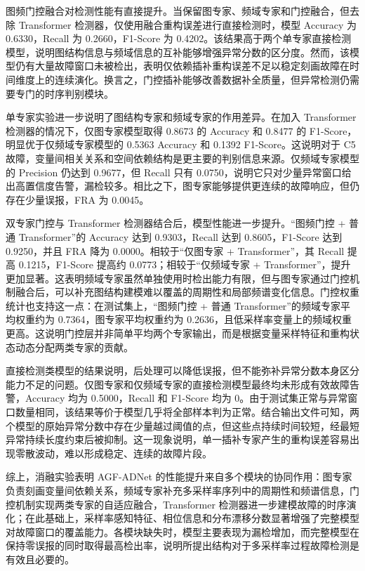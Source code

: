 图频门控融合对检测性能有直接提升。当保留图专家、频域专家和门控融合，但去除 Transformer 检测器，仅使用融合重构误差进行直接检测时，模型 Accuracy 为 0.6330，Recall 为 0.2660，F1-Score 为 0.4202。该结果高于两个单专家直接检测模型，说明图结构信息与频域信息的互补能够增强异常分数的区分度。然而，该模型仍有大量故障窗口未被检出，表明仅依赖插补重构误差不足以稳定刻画故障在时间维度上的连续演化。换言之，门控插补能够改善数据补全质量，但异常检测仍需要专门的时序判别模块。

单专家实验进一步说明了图结构专家和频域专家的作用差异。在加入 Transformer 检测器的情况下，仅图专家模型取得 0.8673 的 Accuracy 和 0.8477 的 F1-Score，明显优于仅频域专家模型的 0.5363 Accuracy 和 0.1392 F1-Score。这说明对于 C5 故障，变量间相关关系和空间依赖结构是更主要的判别信息来源。仅频域专家模型的 Precision 仍达到 0.9677，但 Recall 只有 0.0750，说明它只对少量异常窗口给出高置信度告警，漏检较多。相比之下，图专家能够提供更连续的故障响应，但仍存在少量误报，FRA 为 0.0045。

双专家门控与 Transformer 检测器结合后，模型性能进一步提升。“图频门控 + 普通 Transformer”的 Accuracy 达到 0.9303，Recall 达到 0.8605，F1-Score 达到 0.9250，并且 FRA 降为 0.0000。相较于“仅图专家 + Transformer”，其 Recall 提高 0.1215，F1-Score 提高约 0.0773；相较于“仅频域专家 + Transformer”，提升更加显著。这表明频域专家虽然单独使用时检出能力有限，但与图专家通过门控机制融合后，可以补充图结构建模难以覆盖的周期性和局部频谱变化信息。门控权重统计也支持这一点：在测试集上，“图频门控 + 普通 Transformer”的频域专家平均权重约为 0.7364，图专家平均权重约为 0.2636，且低采样率变量上的频域权重更高。这说明门控层并非简单平均两个专家输出，而是根据变量采样特征和重构状态动态分配两类专家的贡献。

直接检测类模型的结果说明，后处理可以降低误报，但不能弥补异常分数本身区分能力不足的问题。仅图专家和仅频域专家的直接检测模型最终均未形成有效故障告警，Accuracy 均为 0.5000，Recall 和 F1-Score 均为 0。由于测试集正常与异常窗口数量相同，该结果等价于模型几乎将全部样本判为正常。结合输出文件可知，两个模型的原始异常分数中存在少量越过阈值的点，但这些点持续时间较短，经最短异常持续长度约束后被抑制。这一现象说明，单一插补专家产生的重构误差容易出现零散波动，难以形成稳定、连续的故障片段。

综上，消融实验表明 AGF-ADNet 的性能提升来自多个模块的协同作用：图专家负责刻画变量间依赖关系，频域专家补充多采样率序列中的周期性和频谱信息，门控机制实现两类专家的自适应融合，Transformer 检测器进一步建模故障的时序演化；在此基础上，采样率感知特征、相位信息和分布漂移分数显著增强了完整模型对故障窗口的覆盖能力。各模块缺失时，模型主要表现为漏检增加，而完整模型在保持零误报的同时取得最高检出率，说明所提出结构对于多采样率过程故障检测是有效且必要的。

